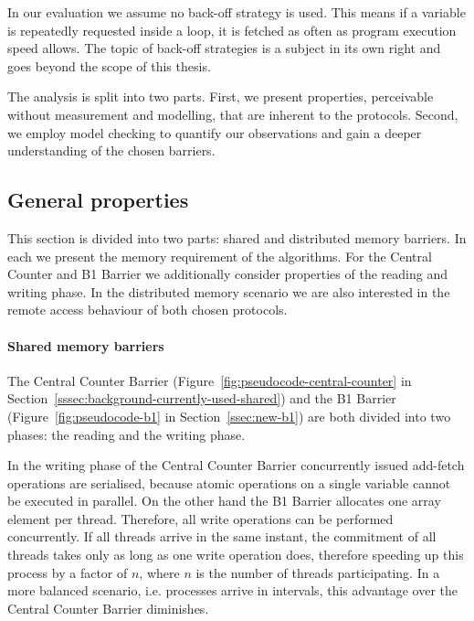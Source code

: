 \documentclass[a4paper, 10pt]{article}
\begin{document}
In our evaluation we assume no back-off strategy is used. This means if a variable is repeatedly requested inside a loop, it is fetched as often as program execution speed allows. The topic of back-off strategies is a subject in its own right and goes beyond the scope of this thesis.

The analysis is split into two parts. First, we present properties, perceivable without measurement and modelling, that are inherent to the protocols. Second, we employ model checking to quantify our observations and gain a deeper understanding of the chosen barriers.

\subsection{General properties}
\label{sssec:analysis-general}
This section is divided into two parts: shared and distributed memory barriers.
In each we present the memory requirement of the algorithms.
For the Central Counter and B1 Barrier we additionally consider properties of the reading and writing phase.
In the distributed memory scenario we are also interested in the remote access behaviour of both chosen protocols.

\paragraph{Shared memory barriers}
\label{sssec:analysis-general-shared}

The Central Counter Barrier (Figure~\ref{fig:pseudocode-central-counter} in Section~\ref{sssec:background-currently-used-shared}) and the B1 Barrier (Figure~\ref{fig:pseudocode-b1} in Section~\ref{ssec:new-b1}) are both divided into two phases: the reading and the writing phase.

In the writing phase of the Central Counter Barrier concurrently issued add-fetch operations are serialised, because atomic operations on a single variable cannot be executed in parallel. On the other hand the B1 Barrier allocates one array element per thread. Therefore, all write operations can be performed concurrently. If all threads arrive in the same instant, the commitment of all threads takes only as long as one write operation does, therefore speeding up this process by a factor of $n$, where $n$ is the number of threads participating. In a more balanced scenario, i.e. processes arrive in intervals, this advantage over the Central Counter Barrier diminishes.
\end{document}
